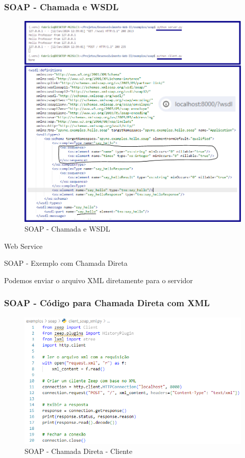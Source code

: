 \documentclass[
	10pt, %
	t, %
]{beamer}
\begin{document}
\begin{frame}[fragile]
	\frametitle{SOAP - Chamada e WSDL}
	
	\begin{figure}
		\includegraphics[width=0.7\linewidth]{soap_example.png}
		\caption{SOAP - Chamada e WSDL}
		\label{fig:soap_server}
	\end{figure}

\end{frame}

\begin{frame}
	\begin{center}
		
		\bigskip\bigskip\bigskip\bigskip %
		{\Large Web Service}
		
		\bigskip\bigskip %
		{\Huge SOAP - Exemplo com Chamada Direta}
		
		\smallskip
		{\small Podemos enviar o arquivo XML diretamente para o servidor}
	\end{center}

\end{frame}

\begin{frame}[fragile]
	\frametitle{SOAP - Código para Chamada Direta com XML}
	
	\begin{figure}
		\includegraphics[width=0.7\linewidth]{client_xml.PNG}
		\caption{SOAP - Chamada Direta - Cliente}
		\label{fig:soap_client_xml}
	\end{figure}

\end{frame}
\end{document}
